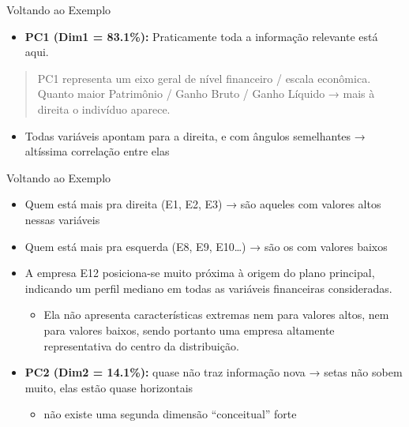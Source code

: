 \documentclass[
  ignorenonframetext,
  aspectratio=169,
]{beamer}
\providecommand{\tightlist}{%
  \setlength{\itemsep}{0pt}\setlength{\parskip}{0pt}}
\begin{document}
\begin{frame}{Voltando ao Exemplo}
\label{voltando-ao-exemplo-14}
\begin{itemize}
\tightlist
\item
  \textbf{PC1 (Dim1 = 83.1\%):} Praticamente toda a informação relevante
  está aqui.
\end{itemize}

\begin{quote}
PC1 representa um eixo geral de nível financeiro / escala econômica.
Quanto maior Patrimônio / Ganho Bruto / Ganho Líquido → mais à direita o
indivíduo aparece.
\end{quote}

\begin{itemize}
\tightlist
\item
  Todas variáveis apontam para a direita, e com ângulos semelhantes →
  altíssima correlação entre elas
\end{itemize}
\end{frame}

\begin{frame}{Voltando ao Exemplo}
\label{voltando-ao-exemplo-15}
\begin{itemize}
\item
  Quem está mais pra direita (E1, E2, E3) → são aqueles com valores
  altos nessas variáveis
\item
  Quem está mais pra esquerda (E8, E9, E10\ldots) → são os com valores
  baixos
\item
  A empresa E12 posiciona-se muito próxima à origem do plano principal,
  indicando um perfil mediano em todas as variáveis financeiras
  consideradas.

  \begin{itemize}
  \tightlist
  \item
    Ela não apresenta características extremas nem para valores altos,
    nem para valores baixos, sendo portanto uma empresa altamente
    representativa do centro da distribuição.
  \end{itemize}
\end{itemize}

\pause

\begin{itemize}
\tightlist
\item
  \textbf{PC2 (Dim2 = 14.1\%):} quase não traz informação nova → setas
  não sobem muito, elas estão quase horizontais

  \begin{itemize}
  \tightlist
  \item
    não existe uma segunda dimensão ``conceitual'' forte
  \end{itemize}
\end{itemize}
\end{frame}
\end{document}
